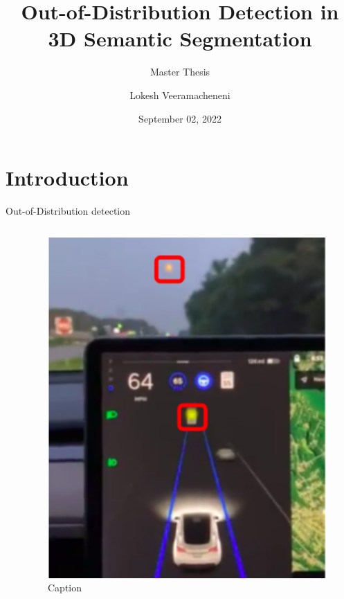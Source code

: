 \documentclass[aspectratio=169]{beamer}
\author[Veeramacheneni]{Lokesh Veeramacheneni}
\title{Out-of-Distribution Detection in 3D Semantic Segmentation}
\subtitle{Master Thesis}
\institute[HBRS]{Hochschule Bonn-Rhein-Sieg}
\date{September 02, 2022}
\begin{document}
{
\begin{frame}
\titlepage
\end{frame}
}

\section{Introduction}
\begin{frame}{Out-of-Distribution detection}
 \begin{columns}
    \begin{column}{0.5\textwidth}
     
    \end{column}
    \begin{column}{0.5\textwidth}
     \begin{figure}
         \centering
         \includegraphics[scale=0.25]{images/Tesla_ex_moon.png}
         \caption{Caption}
         \label{fig:my_label}
     \end{figure}
    \end{column}
 \end{columns}
\end{frame}
\end{document}
